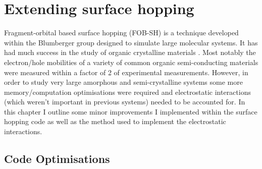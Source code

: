 \chapter{Extending surface hopping}
\label{chap:surface_hopping_ext}
Fragment-orbital based surface hopping (FOB-SH) is a technique developed within the Blumberger group \cite{spencer_fob-sh:_2016} designed to simulate large molecular systems. It has had much success in the study of organic crystalline materials \cite{giannini_crossover_2018, carof_detailed_2017}. Most notably the electron/hole mobilities of a variety of common organic semi-conducting materials were measured within a factor of 2 of experimental measurements. However, in order to study very large amorphous and semi-crystalline systems some more memory/computation optimisations were required and electrostatic interactions (which weren't important in previous systems) needed to be accounted for. In this chapter I outline some minor improvements I implemented within the surface hopping code as well as the method used to implement the electrostatic interactions.

\section{Code Optimisations}

